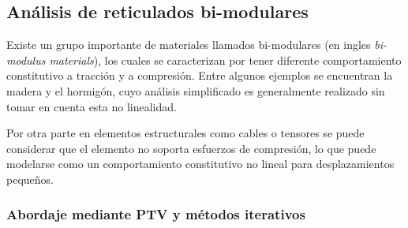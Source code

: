 \subsection{Análisis de reticulados bi-modulares}



%
%
%
%
%


Existe un grupo importante de materiales llamados bi-modulares (en ingles \textit{bi-modulus materials}), los cuales se caracterizan por tener diferente comportamiento constitutivo a tracción y a compresión. %
%
Entre algunos ejemplos se encuentran la madera y el hormigón, cuyo análisis simplificado es generalmente realizado sin tomar en cuenta esta no linealidad. %
%

Por otra parte en elementos estructurales como cables o tensores se puede considerar que el elemento no soporta esfuerzos de compresión, lo que puede modelarse como un comportamiento constitutivo no lineal para desplazamientos pequeños.
% 

\subsubsection{Abordaje mediante PTV y métodos iterativos}

